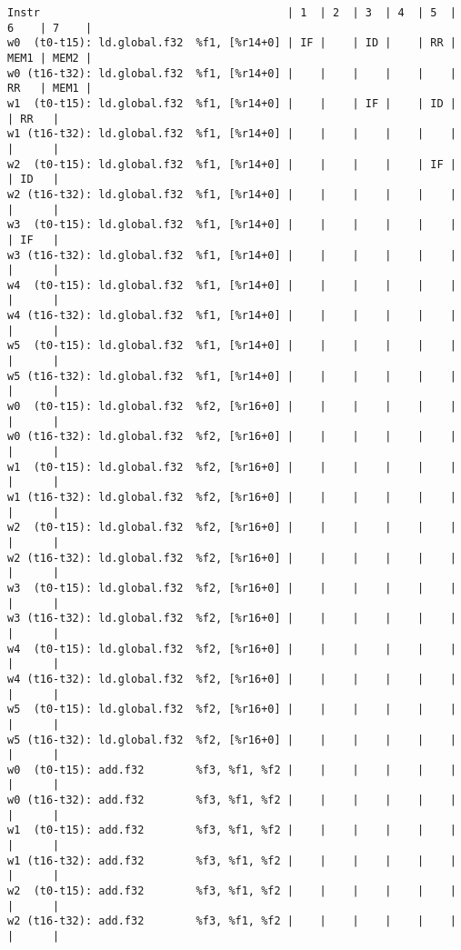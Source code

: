 \documentclass[11pt]{article}
\begin{document}
\begin{Answer}
	\begin{verbatim}
Instr                                      | 1  | 2  | 3  | 4  | 5  | 6    | 7    |
w0  (t0-t15): ld.global.f32  %f1, [%r14+0] | IF |    | ID |    | RR | MEM1 | MEM2 |
w0 (t16-t32): ld.global.f32  %f1, [%r14+0] |    |    |    |    |    | RR   | MEM1 |
w1  (t0-t15): ld.global.f32  %f1, [%r14+0] |    |    | IF |    | ID |      | RR   |
w1 (t16-t32): ld.global.f32  %f1, [%r14+0] |    |    |    |    |    |      |      |
w2  (t0-t15): ld.global.f32  %f1, [%r14+0] |    |    |    |    | IF |      | ID   |
w2 (t16-t32): ld.global.f32  %f1, [%r14+0] |    |    |    |    |    |      |      |
w3  (t0-t15): ld.global.f32  %f1, [%r14+0] |    |    |    |    |    |      | IF   |
w3 (t16-t32): ld.global.f32  %f1, [%r14+0] |    |    |    |    |    |      |      |
w4  (t0-t15): ld.global.f32  %f1, [%r14+0] |    |    |    |    |    |      |      |
w4 (t16-t32): ld.global.f32  %f1, [%r14+0] |    |    |    |    |    |      |      |
w5  (t0-t15): ld.global.f32  %f1, [%r14+0] |    |    |    |    |    |      |      |
w5 (t16-t32): ld.global.f32  %f1, [%r14+0] |    |    |    |    |    |      |      |
w0  (t0-t15): ld.global.f32  %f2, [%r16+0] |    |    |    |    |    |      |      |
w0 (t16-t32): ld.global.f32  %f2, [%r16+0] |    |    |    |    |    |      |      |
w1  (t0-t15): ld.global.f32  %f2, [%r16+0] |    |    |    |    |    |      |      |
w1 (t16-t32): ld.global.f32  %f2, [%r16+0] |    |    |    |    |    |      |      |
w2  (t0-t15): ld.global.f32  %f2, [%r16+0] |    |    |    |    |    |      |      |
w2 (t16-t32): ld.global.f32  %f2, [%r16+0] |    |    |    |    |    |      |      |
w3  (t0-t15): ld.global.f32  %f2, [%r16+0] |    |    |    |    |    |      |      |
w3 (t16-t32): ld.global.f32  %f2, [%r16+0] |    |    |    |    |    |      |      |
w4  (t0-t15): ld.global.f32  %f2, [%r16+0] |    |    |    |    |    |      |      |
w4 (t16-t32): ld.global.f32  %f2, [%r16+0] |    |    |    |    |    |      |      |
w5  (t0-t15): ld.global.f32  %f2, [%r16+0] |    |    |    |    |    |      |      |
w5 (t16-t32): ld.global.f32  %f2, [%r16+0] |    |    |    |    |    |      |      |
w0  (t0-t15): add.f32        %f3, %f1, %f2 |    |    |    |    |    |      |      |
w0 (t16-t32): add.f32        %f3, %f1, %f2 |    |    |    |    |    |      |      |
w1  (t0-t15): add.f32        %f3, %f1, %f2 |    |    |    |    |    |      |      |
w1 (t16-t32): add.f32        %f3, %f1, %f2 |    |    |    |    |    |      |      |
w2  (t0-t15): add.f32        %f3, %f1, %f2 |    |    |    |    |    |      |      |
w2 (t16-t32): add.f32        %f3, %f1, %f2 |    |    |    |    |    |      |      |

\end{verbatim}
\end{Answer}
\end{document}
